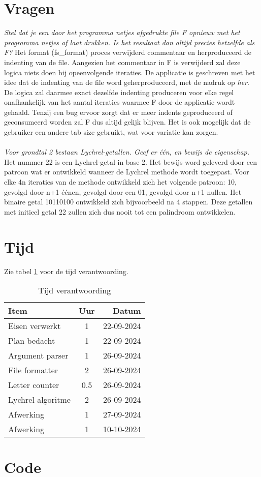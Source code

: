 \documentclass[10pt]{article}
\begin{document}
\section{Vragen}
\textit{Stel dat je een door het programma netjes afgedrukte file F opnieuw met het programma netjes af laat drukken. Is het resultaat dan altijd precies hetzelfde als F?}
\newline Het format (fs\_format) proces verwijderd commentaar en herproduceerd de indenting van de file. 
Aangezien het commentaar in F is verwijderd zal deze logica niets doen bij opeenvolgende iteraties.
De applicatie is geschreven met het idee dat de indenting van de file word geherproduceerd, 
met de nadruk op \textit{her}. De logica zal daarmee exact dezelfde indenting produceren voor elke 
regel onafhankelijk van het aantal iteraties waarmee F door de applicatie wordt gehaald.
Tenzij een bug ervoor zorgt dat er meer indents geproduceerd of geconsumeerd worden zal 
F dus altijd gelijk blijven. Het is ook mogelijk dat de gebruiker een andere tab size gebruikt, 
wat voor variatie kan zorgen.
\\ \hfill \\
\textit{Voor grondtal 2 bestaan Lychrel-getallen. Geef er één, en bewijs de eigenschap.}
\newline 
Het nummer 22 is een Lychrel-getal in base 2. Het bewijs word geleverd door een patroon wat er ontwikkeld wanneer de Lychrel methode wordt toegepast. Voor elke 4n iteraties van de methode ontwikkeld zich het volgende patroon: 10, gevolgd door n+1 éénen, gevolgd door een 01, gevolgd door n+1 nullen. Het binaire getal 10110100 ontwikkeld zich bijvoorbeeld na 4 stappen. Deze getallen met initieel getal 22 zullen zich dus nooit tot een palindroom ontwikkelen.

\newpage
\section{Tijd}
Zie tabel \ref{tab:time} voor de tijd verantwoording.


\begin{table}[H]
      \begin{center}
      \begin{tabular}{ l c r }
            Item & Uur & Datum \\ \hline
            Eisen verwerkt & 1 & 22-09-2024 \\
            Plan bedacht & 1 & 22-09-2024 \\
            Argument parser & 1 & 26-09-2024 \\
            File formatter & 2 & 26-09-2024 \\
            Letter counter & 0.5 & 26-09-2024 \\
            Lychrel algoritme & 2 & 26-09-2024 \\
            Afwerking & 1 & 27-09-2024 \\
            Afwerking & 1 & 10-10-2024 \\
      \end{tabular}
      
      \caption{Tijd verantwoording}
      \label{tab:time}
\end{center}
\end{table}

\section{Code}\label{sec:code}

\end{document}

